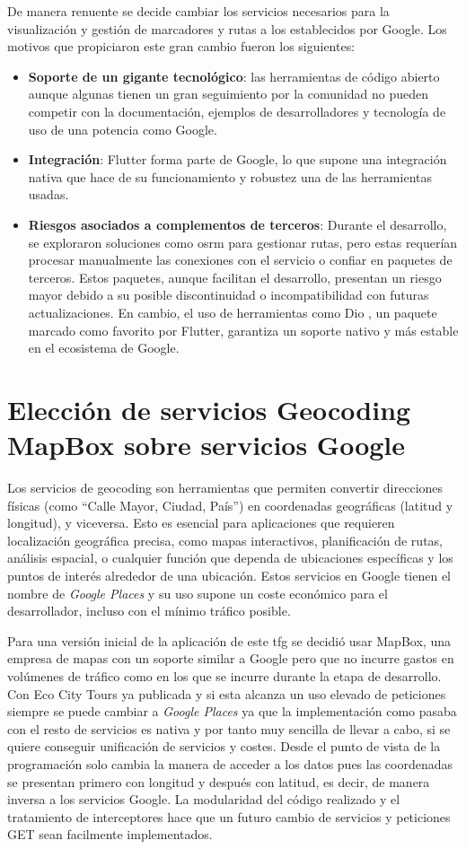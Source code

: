 De manera renuente se decide cambiar los servicios necesarios para la visualización y gestión de marcadores y rutas a los establecidos por Google. Los motivos que propiciaron este gran cambio fueron los siguientes:
\begin{itemize}
	\item \textbf{Soporte de un gigante tecnológico}: las herramientas de código abierto aunque algunas tienen un gran seguimiento por la comunidad no pueden competir con la documentación, ejemplos de desarrolladores y tecnología de uso de una potencia como Google.
	\item \textbf{Integración}: Flutter forma parte de Google, lo que supone una integración nativa que hace de su funcionamiento y robustez una de las herramientas usadas.
	\item \textbf{Riesgos asociados a complementos de terceros}: Durante el desarrollo, se exploraron soluciones como \acrfull{osrm} para gestionar rutas, pero estas requerían procesar manualmente las conexiones con el servicio o confiar en paquetes de terceros. Estos paquetes, aunque facilitan el desarrollo, presentan un riesgo mayor debido a su posible discontinuidad o incompatibilidad con futuras actualizaciones. En cambio, el uso de herramientas como Dio \cite{dio_package}, un paquete marcado como favorito por Flutter, garantiza un soporte nativo y más estable en el ecosistema de Google.
\end{itemize} 


\section{Elección de servicios Geocoding MapBox sobre servicios Google}
Los servicios de geocoding son herramientas que permiten convertir direcciones físicas (como ``Calle Mayor, Ciudad, País'') en coordenadas geográficas (latitud y longitud), y viceversa. Esto es esencial para aplicaciones que requieren localización geográfica precisa, como mapas interactivos, planificación de rutas, análisis espacial, o cualquier función que dependa de ubicaciones específicas y los puntos de interés alrededor de una ubicación. Estos servicios en Google tienen el nombre de \textit{Google Places} y su uso supone un coste económico para el desarrollador, incluso con el mínimo tráfico posible.

Para una versión inicial de la aplicación de este \acrshort{tfg} se decidió usar MapBox\cite{mapbox}, una empresa de mapas con un soporte similar a Google pero que no incurre gastos en volúmenes de tráfico como en los que se incurre durante la etapa de desarrollo.
Con Eco City Tours ya publicada y si esta alcanza un uso elevado de peticiones siempre se puede cambiar a \textit{Google Places} ya que la implementación como pasaba con el resto de servicios es nativa y por tanto muy sencilla de llevar a cabo, si se quiere conseguir unificación de servicios y costes. Desde el punto de vista de la programación solo cambia la manera de acceder a los datos pues las coordenadas se presentan primero con longitud y después con latitud, es decir, de manera inversa a los servicios Google. La modularidad del código realizado y el tratamiento de interceptores hace que un futuro cambio de servicios y peticiones GET sean facilmente implementados.

